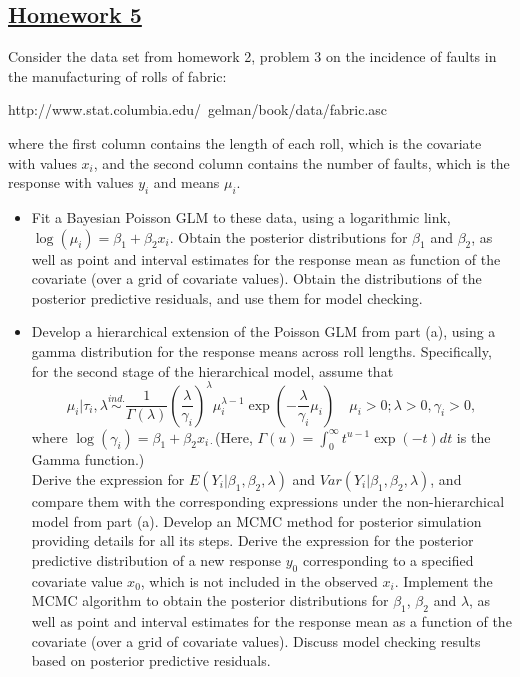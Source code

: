 \documentclass[]{article}
\begin{document}
\renewcommand{\headrulewidth}{0.4pt}
\renewcommand{\footrulewidth}{0.4pt}


\begin{center}
\section*{\underline{Homework 5}}
\end{center}

\begin{enumerate}  \Large{
		\item[Ex1] Consider the data set from homework 2, problem 3 on the incidence of faults in the manufacturing of rolls of fabric:
		\begin{center}
			http://www.stat.columbia.edu/~gelman/book/data/fabric.asc
		\end{center}
		where the first column contains the length of each roll, which is the covariate with values $x_i$, and the second column contains the number of faults, which is the response with values $y_i$ and means $\mu_i$.
		\begin{itemize}
			\item[(a)] Fit a Bayesian Poisson GLM to these data, using a logarithmic link, $\log(\mu_i) = \beta_1 + \beta_2x_i$. Obtain the posterior distributions for $\beta_1$ and $\beta_2$, as well as point and interval estimates for the response mean as function of the covariate (over a grid of covariate values). Obtain the distributions of the posterior predictive residuals, and use them for model checking.
			\item[(b)] Develop a hierarchical extension of the Poisson GLM from part (a), using a gamma distribution for the response means across roll lengths. Specifically, for the second stage of the hierarchical model, assume that
			$$\mu_i|\tau_i,\lambda\stackrel{ind.}{\sim}\frac{1}{\Gamma(\lambda)}(\frac{\lambda}{\gamma_i})^\lambda\mu_i^{\lambda-1}\exp(-\frac{\lambda}{\gamma_i}\mu_i)\quad\mu_i>0;\lambda>0,\gamma_i>0,$$
			where $\log(\gamma_i) = \beta_1+\beta_2x_{i\cdot}$(Here, $\Gamma(u) = \int_{0}^{\infty}t^{u-1}\exp(-t)dt$ is the Gamma function.)\\
			Derive the expression for $E(Y_i|\beta_1,\beta_2,\lambda)$ and $Var(Y_i|\beta_1,\beta_2,\lambda)$, and compare them with the corresponding expressions under the non-hierarchical model from part (a). Develop an MCMC method for posterior simulation providing details for all its steps. Derive the expression for the posterior predictive distribution of a new response $y_0$ corresponding to a specified covariate value $x_0$, which is not included in the observed $x_i$. Implement the MCMC algorithm to obtain the posterior distributions for $\beta_1$, $\beta_2$ and $\lambda$, as well as point and interval estimates for the response mean as a function of the covariate (over a grid of covariate values). Discuss model checking results based on posterior predictive residuals.\\

\end{itemize}}
\end{enumerate}
\end{document}
